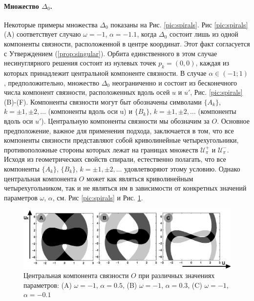 \paragraph{Множество $\Delta_0$.}
Некоторые примеры множества $\Delta_0$ показаны на Рис. \ref{pic:spirals}.
Рис \ref{pic:spirals} (A) соответствует случаю $\omega = -1$, $\alpha = -1.1$, когда $\Delta_0$ состоит лишь из одной компоненты связности, расположенной в центре координат.
Этот факт согласуется с Утверждением (\ref{prop:singular}).
Орбита единственного в этом случае несинуглярного решения состоит из нулевых точек $p_k = (0, 0)$, каждая из которых принадлежит центральной компоненте связности.
В случае $\alpha \in (-1; 1)$, предположительно, множество $\Delta_0$ неограниченно и состоит из бесконечного числа компонент связности, расположенных вдоль осей $u$ и $u'$, Рис. \ref{pic:spirals} (B)-(F).
Компоненты связности могут быт обозначены символами $\{ A_k \}$, $k = \pm 1, \pm 2, \dots$ (компоненты вдоль оси u) и $\{ B_k \}$, $k = \pm 1, \pm 2, \dots$ (компоненты вдоль оси $u'$).
Центральную компоненты связности мы обозначим за $O$.
Основное предположение, важное для применения подхода, заключается в том, что все компоненты связности представляют собой криволинейные четырехугольники, противоположные стороны которых лежат на границах множеств $\mathcal{U}_{\pi}^+$ и $\mathcal{U}_{\pi}^-$.
Исходя из геометрических свойств спирали, естественно полагать, что все компоненты $\{ A_k \}$, $\{ B_k \}$, $k = \pm 1, \pm 2, \dots$ удовлетворяют этому условию.
Однако центральная компонента $O$ может как являться криволинейным четырехугольником, так и не являться им в зависимости от конкретных значений параметров $\omega$, $\alpha$, см. Рис \ref{pic:spirals} и Рис. \ref{pic:central}.
%
\begin{figure}
\includegraphics[width=\linewidth]{pic/central.eps}
\caption{Центральная компонента связности $O$ при различных значениях параметров: (A) $\omega = -1$, $\alpha = 0.5$, (B) $\omega = -1$, $\alpha = 0.3$, (C) $\omega = -1$, $\alpha = -0.1$}
\label{pic:central}
\end{figure}
%

